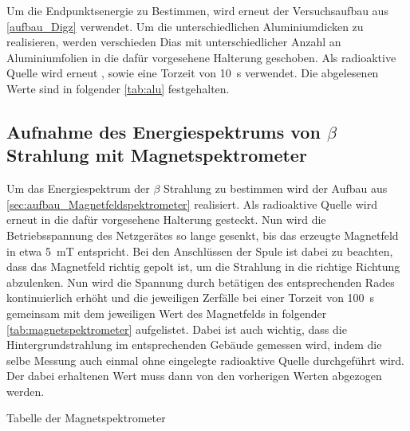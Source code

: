 \documentclass[12pt,english,ngerman]{scrartcl}
\begin{document}
Um die Endpunktsenergie zu Bestimmen, wird erneut der Versuchsaufbau aus
\autoref{aufbau_Digz} verwendet. Um die unterschiedlichen Aluminiumdicken zu
realisieren, werden verschieden Dias mit unterschiedlicher Anzahl an
Aluminiumfolien in die dafür vorgesehene Halterung geschoben. Als radioaktive
Quelle wird erneut , sowie eine Torzeit von \SI{10}{\second}
verwendet. Die abgelesenen Werte sind in folgender \autoref{tab:alu}
festgehalten.

%     

\subsection{Aufnahme des Energiespektrums von \texorpdfstring{$\beta$}{beta} Strahlung mit Magnetspektrometer}

Um das Energiespektrum der $\beta$ Strahlung zu bestimmen wird der Aufbau aus
\autoref{sec:aufbau_Magnetfeldspektrometer} realisiert. Als radioaktive Quelle
wird erneut  in die dafür vorgesehene Halterung gesteckt. Nun
wird die Betriebsspannung des Netzgerätes so lange gesenkt, bis das erzeugte
Magnetfeld in etwa \SI{5}{\milli\tesla} entspricht. Bei den Anschlüssen der
Spule ist dabei zu beachten, dass das Magnetfeld richtig gepolt ist, um die
Strahlung in die richtige Richtung abzulenken. Nun wird die Spannung durch
betätigen des entsprechenden Rades kontinuierlich erhöht und die jeweiligen
Zerfälle bei einer Torzeit von \SI{100}{\second} gemeinsam mit dem jeweiligen
Wert des Magnetfelds in folgender \autoref{tab:magnetspektrometer} aufgelistet.
Dabei ist auch wichtig, dass die Hintergrundstrahlung im entsprechenden Gebäude
gemessen wird, indem die selbe Messung auch einmal ohne eingelegte radioaktive
Quelle durchgeführt wird. Der dabei erhaltenen Wert muss dann von den
vorherigen Werten abgezogen werden.

\begin{table}[H]
  \caption{Tabelle der Magnetspektrometer}
  \label{tab:magnetspektrometer}
  \begin{center}
    
  \end{center}
\end{table}
\end{document}
